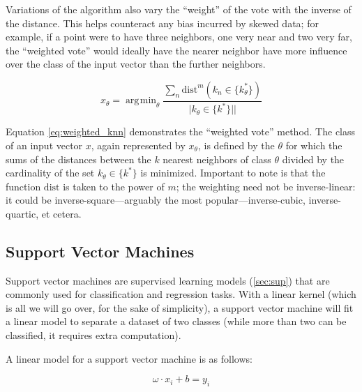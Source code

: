 \documentclass{comjnl}
\newcommand{\abs}[1]{\lvert #1 \rvert|}
\DeclareMathOperator*{\argmin}{\arg\!\min}
\numberwithin{equation}{subsection}
\begin{document}
            Variations of the algorithm also vary the ``weight'' of the vote with the inverse of
            the distance. This helps counteract any bias incurred by skewed data; for example, if
            a point were to have three neighbors, one very near and two very far, the ``weighted
            vote'' would ideally have the nearer neighbor have more influence over the class of the
            input vector than the further neighbors.

            \begin{equation}\label{eq:weighted_knn}
                x_{\theta}=\argmin_{\theta} \frac{\sum_n{\text{dist}^m(k_n \in \{k_{\theta}^*\})}}{\abs{k_{\theta} \in \{k^*\}}}
            \end{equation}

            \noindent Equation \eqref{eq:weighted_knn} demonstrates the ``weighted vote'' method.
            The class of an input vector $x$, again represented by $x_{\theta}$, is defined by the
            $\theta$ for which the sums of the distances between the $k$ nearest neighbors of class
            $\theta$ divided by the cardinality of the set $k_{\theta} \in \{k^{*}\}$ is minimized.
            Important to note is that the function $\text{dist}$ is taken to the power of $m$; the
            weighting need not be inverse-linear: it could be inverse-square---arguably the most
            popular---inverse-cubic, inverse-quartic, et cetera.

        \subsection{Support Vector Machines}\label{subsec:svm}

            Support vector machines are supervised learning models (\ref{sec:sup}) that are commonly
            used for classification and regression tasks. With a linear kernel (which is all we
            will go over, for the sake of simplicity), a support vector machine will fit a linear
            model to separate a dataset of two classes (while more than two can be classified, it
            requires extra computation).

            A linear model for a support vector machine is as follows:

            \begin{equation}\label{eq:hyperplane}
                \omega \cdot x_i + b = y_i
            \end{equation}
\end{document}
